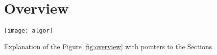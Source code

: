 \section{Overview}
\begin{figure*}[t]
  \texttt{[image: algor]}
  \label{fig:overview}
\end{figure*}
Explanation of the Figure \ref{fig:overview} with pointers to the Sections.

